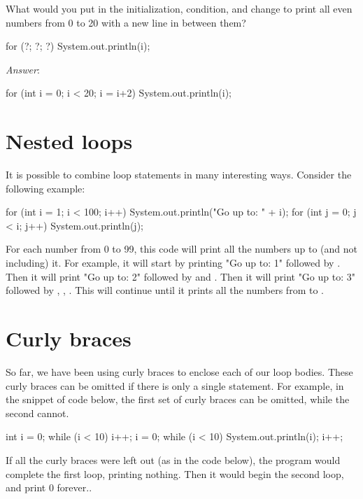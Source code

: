 \begin{example}
What would you put in the initialization, condition, and change to print all even numbers from 0 to 20 with a new line in between them?

\begin{code}
for (?; ?; ?)
{
    System.out.println(i);
}
\end{code}

\emph{Answer}:
\begin{code}
for (int i = 0; i < 20; i = i+2)
{
    System.out.println(i);
}
\end{code}
\end{example}

\section{Nested loops}
It is possible to combine loop statements in many interesting ways. Consider the following example:

\begin{code}
for (int i = 1; i < 100; i++)
{
    System.out.println("Go up to: " + i);
    for (int j = 0; j < i; j++)
    {
        System.out.println(j);
    }
}
\end{code}

\noindent For each number from 0 to 99, this code will print all the numbers up to (and not including) it.  For example, it will start by printing "Go up to: 1" followed by .  Then it will print "Go up to: 2"  followed by  and . Then it will print "Go up to: 3"  followed by , ,  . This will continue until it prints all the numbers from  to .

\section{Curly braces}
So far, we have been using curly braces to enclose each of our loop bodies. These curly braces can be omitted if there is only a single statement. For example, in the snippet of code below, the first set of curly braces can be omitted, while the second cannot.

\begin{code}
int i = 0;
while (i < 10)
{
    i++;
}
i = 0;
while (i < 10)
{
    System.out.println(i);
    i++;
}
\end{code}

\noindent If all the curly braces were left out (as in the code below), the program would complete the first loop, printing nothing. Then it would begin the second loop, and print 0 forever..

